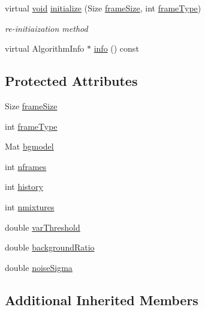 \begin{DoxyCompactItemize}
virtual \hyperlink{legacy_8hpp_a8bb47f092d473522721002c86c13b94e}{void} \hyperlink{classcv_1_1BackgroundSubtractorMOG_a8228e6b3c1459ef710d2c4f1407ce0fb}{initialize} (Size \hyperlink{classcv_1_1BackgroundSubtractorMOG_afff29812b6b010e5b9e79e6cc0c42c5d}{frame\-Size}, int \hyperlink{classcv_1_1BackgroundSubtractorMOG_ae501326f28047d32de5bb21549a47ea5}{frame\-Type})
\begin{DoxyCompactList}\small\item\em re-\/initiaization method \end{DoxyCompactList}\item 
virtual Algorithm\-Info $\ast$ \hyperlink{classcv_1_1BackgroundSubtractorMOG_a2db1882fd543a0eeda703e7073023146}{info} () const 
\end{DoxyCompactItemize}
\subsection*{Protected Attributes}
\begin{DoxyCompactItemize}
\item 
Size \hyperlink{classcv_1_1BackgroundSubtractorMOG_afff29812b6b010e5b9e79e6cc0c42c5d}{frame\-Size}
\item 
int \hyperlink{classcv_1_1BackgroundSubtractorMOG_ae501326f28047d32de5bb21549a47ea5}{frame\-Type}
\item 
Mat \hyperlink{classcv_1_1BackgroundSubtractorMOG_aafcd243ff6ee6cb4e619488364c6836a}{bgmodel}
\item 
int \hyperlink{classcv_1_1BackgroundSubtractorMOG_a208c2931698061759ff271f6fa494bd4}{nframes}
\item 
int \hyperlink{classcv_1_1BackgroundSubtractorMOG_aa5250ac6323aa290271de50b0eca1660}{history}
\item 
int \hyperlink{classcv_1_1BackgroundSubtractorMOG_a3df74a7b99c0a299eae9e46942a5c9a2}{nmixtures}
\item 
double \hyperlink{classcv_1_1BackgroundSubtractorMOG_a65756e9a252270d5ad906c8a94bc0b7e}{var\-Threshold}
\item 
double \hyperlink{classcv_1_1BackgroundSubtractorMOG_a0a64ad8542c52c2638d4b61038d5f5e3}{background\-Ratio}
\item 
double \hyperlink{classcv_1_1BackgroundSubtractorMOG_a5e8fee996d73bd3944a2ff27ff89519b}{noise\-Sigma}
\end{DoxyCompactItemize}
\subsection*{Additional Inherited Members}


